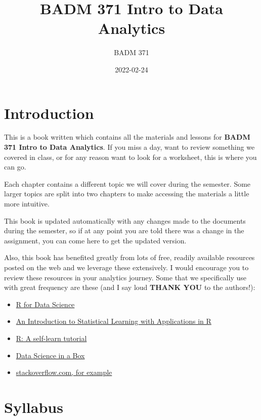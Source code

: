 \documentclass[
]{book}
\title{BADM 371 Intro to Data Analytics}
\author{BADM 371}
\date{2022-02-24}
\providecommand{\tightlist}{%
  \setlength{\itemsep}{0pt}\setlength{\parskip}{0pt}}
\begin{document}
\maketitle

{
\setcounter{tocdepth}{1}
\tableofcontents
}
\hypertarget{introduction}{%
\chapter{Introduction}\label{introduction}}

This is a book written which contains all the materials and lessons for \textbf{BADM 371 Intro to Data Analytics}. If you miss a day, want to review something we covered in class, or for any reason want to look for a worksheet, this is where you can go.

Each chapter contains a different topic we will cover during the semester. Some larger topics are split into two chapters to make accessing the materials a little more intuitive.

This book is updated automatically with any changes made to the documents during the semester, so if at any point you are told there was a change in the assignment, you can come here to get the updated version.

Also, this book has benefited greatly from lots of free, readily available resources posted on the web and we leverage these extensively. I would encourage you to review these resources in your analytics journey. Some that we specifically use with great frequency are these (and I say loud \textbf{THANK YOU} to the authors!):

\begin{itemize}
\tightlist
\item
  \href{https://r4ds.had.co.nz/}{R for Data Science}
\item
  \href{https://trevorhastie.github.io/ISLR/}{An Introduction to Statistical Learning with Applications in R}
\item
  \href{https://gsp.humboldt.edu/olm/R/Tutorials/BestFirstRTutorial.pdf}{R: A self-learn tutorial}
\item
  \href{https://datasciencebox.org/}{Data Science in a Box}
\item
  \href{https://stackoverflow.com/questions/4862178/remove-rows-with-all-or-some-nas-missing-values-in-data-frame?rq=1}{stackoverflow.com, for example}
\end{itemize}

\hypertarget{syllabus}{%
\chapter{Syllabus}\label{syllabus}}
\end{document}
